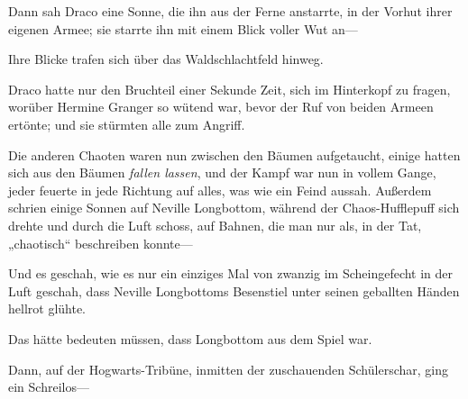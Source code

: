 Dann sah Draco eine Sonne, die ihn aus der Ferne anstarrte, in der Vorhut ihrer eigenen Armee; sie starrte ihn mit einem Blick voller Wut an—

Ihre Blicke trafen sich über das Waldschlachtfeld hinweg.

Draco hatte nur den Bruchteil einer Sekunde Zeit, sich im Hinterkopf zu fragen, worüber Hermine Granger so wütend war, bevor der Ruf von beiden Armeen ertönte; und sie stürmten alle zum Angriff.

\later

Die anderen Chaoten waren nun zwischen den Bäumen aufgetaucht, einige hatten sich aus den Bäumen \emph{fallen lassen}, und der Kampf war nun in vollem Gange, jeder feuerte in jede Richtung auf alles, was wie ein Feind aussah. Außerdem schrien einige Sonnen  auf Neville Longbottom, während der Chaos-Hufflepuff sich drehte und durch die Luft schoss, auf Bahnen, die man nur als, in der Tat, „chaotisch“ beschreiben konnte—

Und es geschah, wie es nur ein einziges Mal von zwanzig im Scheingefecht in der Luft geschah, dass Neville Longbottoms Besenstiel unter seinen geballten Händen hellrot glühte.

Das hätte bedeuten müssen, dass Longbottom aus dem Spiel war.

Dann, auf der Hogwarts-Tribüne, inmitten der zuschauenden Schülerschar, ging ein Schreilos—

